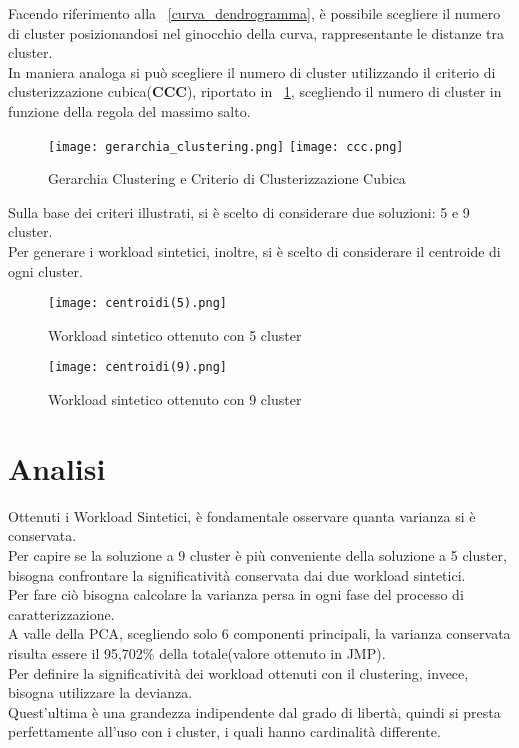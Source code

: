 Facendo riferimento alla \figurename~\ref{curva_dendrogramma}, è possibile scegliere
il numero di cluster posizionandosi nel ginocchio della curva, rappresentante le
distanze tra cluster.\\
In maniera analoga si può scegliere il numero di cluster utilizzando il criterio
di clusterizzazione cubica(\textbf{CCC}), riportato in \figurename~\ref{ccc},
scegliendo il numero di cluster in funzione della regola del massimo salto.\\

\begin{figure}[htbp]
\centering
\texttt{[image: gerarchia\_clustering.png]}%
\qquad\qquad
\texttt{[image: ccc.png]}
\caption{Gerarchia Clustering e Criterio di Clusterizzazione Cubica}
\label{ccc}
\end{figure}

\clearpage

Sulla base dei criteri illustrati, si è scelto di considerare due soluzioni:
5 e 9 cluster.\\
Per generare i workload sintetici, inoltre, si è scelto di considerare il
centroide di ogni cluster.\\

\begin{figure}[!htbp]
	\texttt{[image: centroidi(5).png]}
  \caption{Workload sintetico ottenuto con 5 cluster}
  \label{}
\end{figure}

\begin{figure}[!htbp]
	\texttt{[image: centroidi(9).png]}
  \caption{Workload sintetico ottenuto con 9 cluster}
  \label{centroidi9}
\end{figure}

\clearpage
\section{Analisi}
Ottenuti i Workload Sintetici, è fondamentale osservare quanta varianza si è
conservata.\\
Per capire se la soluzione a 9 cluster è più conveniente della soluzione
a 5 cluster, bisogna confrontare la significatività conservata dai due workload sintetici.\\
Per fare ciò bisogna calcolare la varianza persa in ogni fase del processo di
caratterizzazione.\\
A valle della PCA, scegliendo solo 6 componenti principali, la varianza conservata
 risulta essere il 95,702\% della totale(valore ottenuto in JMP).\\
Per definire la significatività dei workload ottenuti con il clustering, invece, bisogna
utilizzare la devianza.\\
Quest'ultima è una grandezza indipendente dal grado di libertà, quindi si presta
perfettamente all'uso con i cluster, i quali hanno cardinalità differente.\\

